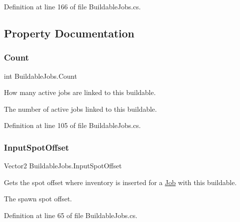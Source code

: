 Definition at line 166 of file Buildable\+Jobs.\+cs.



\subsection{Property Documentation}
\mbox{\label{class_buildable_jobs_a19d62a0f9f218a281481bae5b3d6863b}} 
\subsubsection{\texorpdfstring{Count}{Count}}
{\footnotesize\ttfamily int Buildable\+Jobs.\+Count\hspace{0.3cm}{\ttfamily [get]}}



How many active jobs are linked to this buildable. 

The number of active jobs linked to this buildable.

Definition at line 105 of file Buildable\+Jobs.\+cs.

\mbox{\label{class_buildable_jobs_a90df4c5107208eaa614604135f395caf}} 
\subsubsection{\texorpdfstring{Input\+Spot\+Offset}{InputSpotOffset}}
{\footnotesize\ttfamily Vector2 Buildable\+Jobs.\+Input\+Spot\+Offset\hspace{0.3cm}{\ttfamily [get]}}



Gets the spot offset where inventory is inserted for a \hyperlink{class_job}{Job} with this buildable. 

The spawn spot offset.

Definition at line 65 of file Buildable\+Jobs.\+cs.

\mbox{\label{class_buildable_jobs_afee5486dcb9dfdea6e639fe96c1ccbc3}} 
